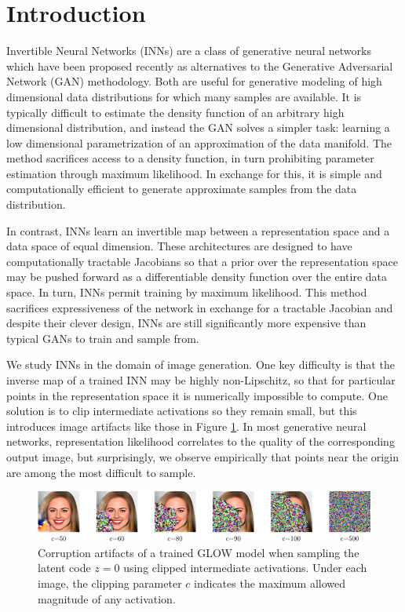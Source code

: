
\section{Introduction}
Invertible Neural Networks (INNs) are a class of generative neural networks which have been proposed recently as alternatives to the Generative Adversarial Network (GAN) methodology. Both are useful for generative modeling of high dimensional data distributions for which many samples are available. It is typically difficult to estimate the density function of an arbitrary high dimensional distribution, and instead the GAN solves a simpler task: learning a low dimensional parametrization of an approximation of the data manifold. The method sacrifices access to a density function, in turn prohibiting parameter estimation through maximum likelihood. In exchange for this, it is simple and computationally efficient to generate approximate samples from the data distribution.

In contrast, INNs learn an invertible map between a representation space and a data space of equal dimension. These architectures are designed to have computationally tractable Jacobians so that a prior over the representation space may be pushed forward as a differentiable density function over the entire data space. In turn, INNs permit training by maximum likelihood. This method sacrifices expressiveness of the network in exchange for a tractable Jacobian and despite their clever design, INNs are still significantly more expensive than typical GANs to train and sample from.

We study INNs in the domain of image generation. One key difficulty is that the inverse map of a trained INN may be highly non-Lipschitz, so that for particular points in the representation space it is numerically impossible to compute. One solution is to clip intermediate activations so they remain small, but this introduces image artifacts like those in Figure \ref{fig:corruption}. In most generative neural networks, representation likelihood correlates to the quality of the corresponding output image, but surprisingly, we observe empirically that points near the origin are among the most difficult to sample. 
\begin{figure}
    \centering
    \includegraphics[width=\linewidth]{figures/figs.png}
    \caption{Corruption artifacts of a trained GLOW model when sampling the latent code $z=0$ using clipped intermediate activations. Under each image, the clipping parameter $c$ indicates the maximum allowed magnitude of any activation.}
    \label{fig:corruption}
\end{figure}

